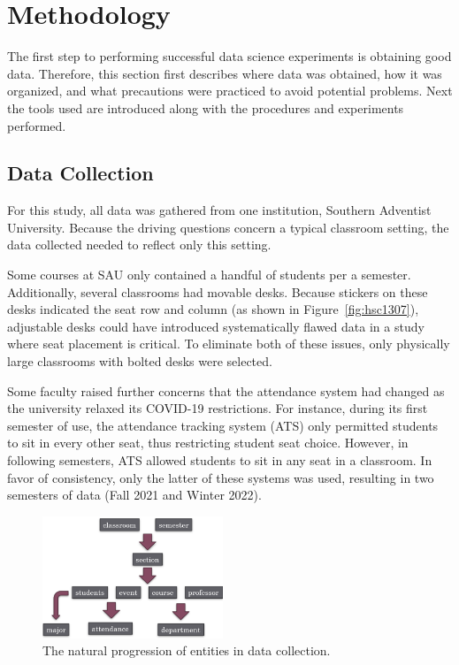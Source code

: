 \section{Methodology}
The first step to performing successful data science experiments is obtaining good data. Therefore, this section first describes where data was obtained, how it was organized, and what precautions were practiced to avoid potential problems. Next the tools used are introduced along with the procedures and experiments performed.
\subsection{Data Collection}
For this study, all data was gathered from one institution, Southern Adventist University. Because the driving questions concern a typical classroom setting, the data collected needed to reflect only this setting.

Some courses at SAU only contained a handful of students per a semester. Additionally, several classrooms had movable desks. Because stickers on these desks indicated the seat row and column (as shown in Figure~\ref{fig:hsc1307}), adjustable desks could have introduced systematically flawed data in a study where seat placement is critical. To eliminate both of these issues, only physically large classrooms with bolted desks were selected.

Some faculty raised further concerns that the attendance system had changed as the university relaxed its COVID-19 restrictions. For instance, during its first semester of use, the attendance tracking system (ATS) only permitted students to sit in every other seat, thus restricting student seat choice. However, in following semesters, ATS allowed students to sit in any seat in a classroom. In favor of consistency, only the latter of these systems was used, resulting in two semesters of data (Fall 2021 and Winter 2022).

\begin{figure}[ht]
  \centering
  \includegraphics[width=0.48\textwidth]{figures/dataCollectionEntityTraversal.png}
  \caption{The natural progression of entities in data collection.}
  \label{fig:dataCollectionTraversal}
\end{figure}

